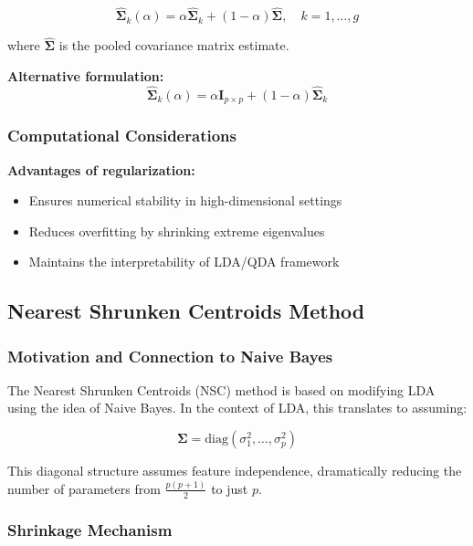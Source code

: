 \documentclass[12pt,a4paper]{article}
\begin{document}
\begin{equation}
\hat{\boldsymbol{\Sigma}}_k(\alpha) = \alpha\hat{\boldsymbol{\Sigma}}_k + (1-\alpha)\hat{\boldsymbol{\Sigma}}, \quad k = 1, \ldots, g
\end{equation}

where $\hat{\boldsymbol{\Sigma}}$ is the pooled covariance matrix estimate.

\textbf{Alternative formulation:}
\begin{equation}
\hat{\boldsymbol{\Sigma}}_k(\alpha) = \alpha \mathbf{I}_{p \times p} + (1-\alpha)\hat{\boldsymbol{\Sigma}}_k
\end{equation}

\subsubsection{Computational Considerations}

\textbf{Advantages of regularization:}
\begin{itemize}
    \item Ensures numerical stability in high-dimensional settings
    \item Reduces overfitting by shrinking extreme eigenvalues
    \item Maintains the interpretability of LDA/QDA framework
\end{itemize}

\subsection{Nearest Shrunken Centroids Method}

\subsubsection{Motivation and Connection to Naive Bayes}

The Nearest Shrunken Centroids (NSC) method is based on modifying LDA using the idea of Naive Bayes. In the context of LDA, this translates to assuming:

\begin{equation}
\boldsymbol{\Sigma} = \text{diag}(\sigma_1^2, \ldots, \sigma_p^2)
\end{equation}

This diagonal structure assumes feature independence, dramatically reducing the number of parameters from $\frac{p(p+1)}{2}$ to just $p$.

\subsubsection{Shrinkage Mechanism}
\end{document}
